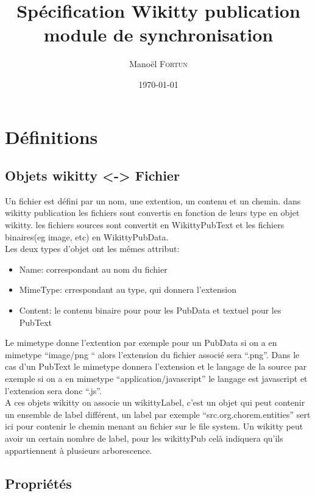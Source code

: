 \documentclass{article}
\title{Spécification Wikitty publication module de synchronisation}
\author{ Mano\"el \textsc{Fortun}}
\date{\today}
\begin{document}
\maketitle

\section{Définitions}

\subsection{Objets wikitty <-> Fichier }

Un fichier est défini par un nom, une extention, un contenu et un chemin.
dans wikitty publication les fichiers sont convertis en fonction de leurs type
en objet wikitty. les fichiers sources sont convertit en WikittyPubText et les
fichiers binaires(eg image, etc) en WikittyPubData. \\

Les deux types d'objet ont les mêmes attribut:
\begin{itemize}
\item Name: correspondant au nom du fichier
\item MimeType: crrespondant au type, qui donnera l'extension
\item Content: le contenu binaire pour pour les PubData et textuel pour les PubText
\end{itemize} 


Le mimetype donne l'extention par exemple pour un PubData si on a en mimetype ``image/png
`` alors l'extension du fichier associé sera ``.png''. Dans le cas d'un PubText
le mimetype donnera l'extension et le langage de la source par exemple si on a
en mimetype ``application/javascript'' le langage est javascript et l'extension
sera donc ``.js''. \\

A ces objets wikitty on associe un wikittyLabel, c'est un objet qui peut
contenir un ensemble de label différent, un label par exemple
``src.org.chorem.entities'' sert ici pour contenir le chemin menant au fichier
sur le file system. Un wikitty peut avoir un certain nombre de label, pour les
wikittyPub celà indiquera qu'ils appartiennent à plusieurs arborescence. 

\subsection{Propriétés}
\end{document}
